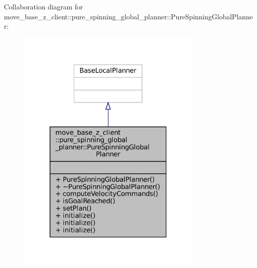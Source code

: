 Collaboration diagram for move\+\_\+base\+\_\+z\+\_\+client\+:\+:pure\+\_\+spinning\+\_\+global\+\_\+planner\+:\+:Pure\+Spinning\+Global\+Planner\+:
\nopagebreak
\begin{figure}[H]
\begin{center}
\leavevmode
\includegraphics[width=256pt]{classmove__base__z__client_1_1pure__spinning__global__planner_1_1PureSpinningGlobalPlanner__coll__graph}
\end{center}
\end{figure}
